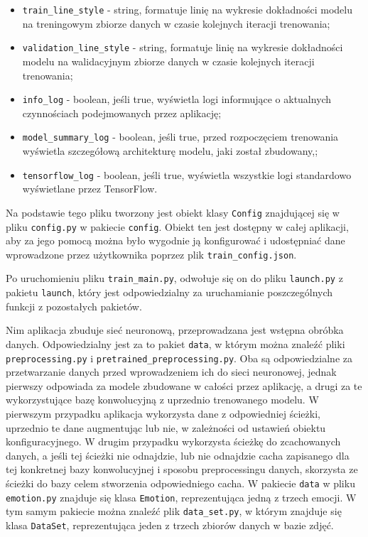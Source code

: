 \begin{itemize}
    \item \verb|train_line_style| - string, formatuje linię na wykresie dokładności modelu na treningowym zbiorze danych w czasie kolejnych iteracji trenowania;
    \item \verb|validation_line_style| - string, formatuje linię na wykresie dokładności modelu na walidacyjnym zbiorze danych w czasie kolejnych iteracji trenowania;
    \item \verb|info_log| - boolean, jeśli true, wyświetla logi informujące o aktualnych czynnościach podejmowanych przez aplikację;
    \item \verb|model_summary_log| - boolean, jeśli true, przed rozpoczęciem trenowania wyświetla szczegółową architekturę modelu, jaki został zbudowany,;
    \item \verb|tensorflow_log| - boolean, jeśli true, wyświetla wszystkie logi standardowo wyświetlane przez TensorFlow.
\end{itemize}
Na podstawie tego pliku tworzony jest obiekt klasy \verb|Config| znajdującej się w pliku \verb|config.py| w pakiecie \verb|config|. Obiekt ten jest dostępny w całej aplikacji, aby za jego pomocą można było wygodnie ją konfigurować i udostępniać dane wprowadzone przez użytkownika poprzez plik \verb|train_config.json|.

Po uruchomieniu pliku \verb|train_main.py|, odwołuje się on do pliku \verb|launch.py| z pakietu \verb|launch|, który jest odpowiedzialny za uruchamianie poszczególnych funkcji z pozostałych pakietów.

Nim aplikacja zbuduje sieć neuronową, przeprowadzana jest wstępna obróbka danych. Odpowiedzialny jest za to pakiet \verb|data|, w którym można znaleźć pliki \verb|preprocessing.py| i \verb|pretrained_preprocessing.py|. Oba są odpowiedzialne za przetwarzanie danych przed wprowadzeniem ich do sieci neuronowej, jednak pierwszy odpowiada za modele zbudowane w całości przez aplikację, a drugi za te wykorzystujące bazę konwolucyjną z uprzednio trenowanego modelu.
W pierwszym przypadku aplikacja wykorzysta dane z odpowiedniej ścieżki, uprzednio te dane augmentując lub nie, w zależności od ustawień obiektu konfiguracyjnego. W drugim przypadku wykorzysta ścieżkę do zcachowanych danych, a jeśli tej ścieżki nie odnajdzie, lub nie odnajdzie cacha zapisanego dla tej konkretnej bazy konwolucyjnej i sposobu preprocessingu danych, skorzysta ze ścieżki do bazy celem stworzenia odpowiedniego cacha.
W pakiecie \verb|data| w pliku \verb|emotion.py| znajduje się klasa \verb|Emotion|, reprezentująca jedną z trzech emocji. W tym samym pakiecie można znaleźć plik \verb|data_set.py|, w którym znajduje się klasa \verb|DataSet|, reprezentująca jeden z trzech zbiorów danych w bazie zdjęć.

